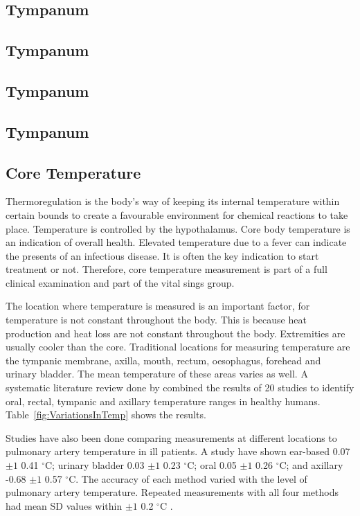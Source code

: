 \subsection{Tympanum}

\subsection{Tympanum}

\subsection{Tympanum}

\subsection{Tympanum}










\subsection{Core Temperature}
Thermoregulation is the body's way of keeping its internal temperature within certain bounds to create a favourable environment for chemical reactions to take place. Temperature is controlled by the hypothalamus. Core body temperature is an indication of overall health. Elevated temperature due to a fever can indicate the presents of an infectious disease. It is often the key indication to start treatment or not. Therefore, core temperature measurement is part of a full clinical examination and part of the vital sings group.

The location where temperature is measured is an important factor, for temperature is not constant throughout the body. This is because heat production and heat loss are not constant throughout the body. Extremities are usually cooler than the core. Traditional locations for measuring temperature are the tympanic membrane, axilla, mouth, rectum, oesophagus, forehead and urinary bladder. The mean temperature of these areas varies as well. A systematic literature review done by \cite{sund2002normal} combined the results of 20 studies to identify oral, rectal, tympanic and axillary temperature ranges in healthy humans. Table~\ref{fig:VariationsInTemp} shows the results.



Studies have also been done comparing measurements at different locations to pulmonary artery temperature in ill patients. A study have shown ear-based 0.07 $\pm 1$ 0.41 $^{\circ}$C; urinary bladder 0.03 $\pm 1$ 0.23 $^{\circ}$C; oral 0.05 $\pm 1$ 0.26 $^{\circ}$C; and axillary -0.68 $\pm 1$ 0.57 $^{\circ}$C. The accuracy of each method varied with the level of pulmonary artery temperature. Repeated measurements with all four methods had mean SD values within $\pm 1$ 0.2 $^{\circ}$C \citep{erickson1993comparison}.

